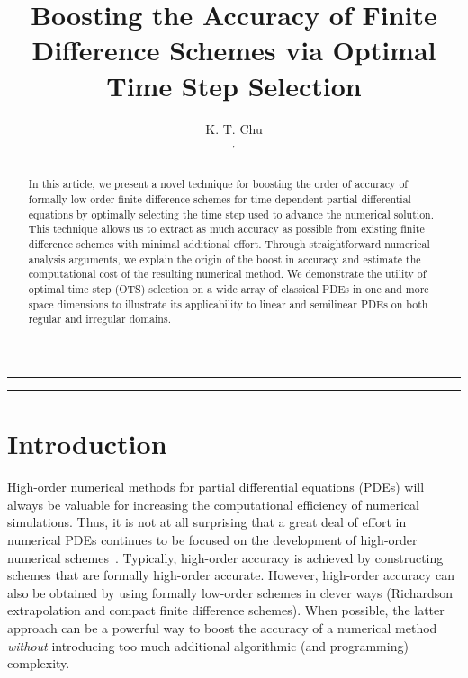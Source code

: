\documentclass[fleqn,12pt,twoside]{article}
\begin{document}


\title{Boosting the Accuracy of Finite Difference Schemes 
       via Optimal Time Step Selection}

\author{K. T. Chu\address{Vitamin D, Inc., Menlo Park, CA 94025}$^,$\address{Institute of High Performance Computing, A*STAR, Singapore, Singapore} 
}


\maketitle

\noindent \rule{6.3in}{1pt}

\begin{abstract}
In this article, we present a novel technique for boosting the order of 
accuracy of formally low-order finite difference schemes for time dependent 
partial differential equations by optimally selecting the time step used
to advance the numerical solution.  This technique allows us to extract as
much accuracy as possible from existing finite difference schemes with 
minimal additional effort.  Through straightforward numerical 
analysis arguments, we explain the origin of the boost in accuracy and 
estimate the computational cost of the resulting numerical 
method.  We demonstrate the utility of optimal time step (OTS) selection on a 
wide array of classical PDEs in one and more space dimensions to illustrate 
its applicability to linear and semilinear PDEs on both regular and irregular 
domains.  
\end{abstract}

\noindent \rule{6.3in}{1pt}


\section{Introduction}
High-order numerical methods for partial differential equations (PDEs) will 
always be valuable for increasing the computational efficiency of numerical 
simulations.  Thus, it is not at all surprising that a great deal of effort in 
numerical PDEs continues to be focused on the development of high-order 
numerical 
schemes~\cite{bruger_2005,gibou_2005,ito_2005,shukla_2005,shukla_2007}.  
Typically, high-order accuracy is achieved by constructing
schemes that are formally high-order accurate.  However, high-order 
accuracy can also be obtained by using formally low-order schemes in clever 
ways (\eg Richardson extrapolation and compact finite difference schemes).  
When possible, the latter approach can be a powerful way to boost the accuracy 
of a numerical method \emph{without} introducing too much additional 
algorithmic (and programming) complexity.
\end{document}
